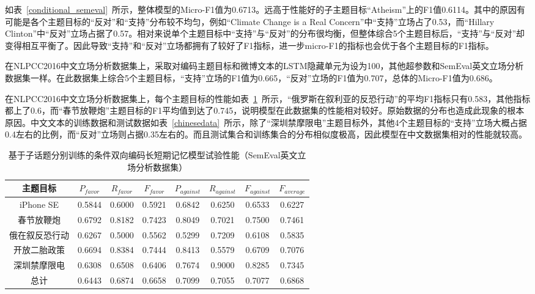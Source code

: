如表~\ref{conditional_semeval}~所示，整体模型的Micro-F1值为0.6713。远高于性能好的子主题目标“Atheism”上的F1值0.6114。其中的原因有可能是各个主题目标的“反对”和“支持”分布较不均匀，例如“Climate Change is a Real Concern”中“支持”立场占了0.53，而“Hillary Clinton”中“反对”立场占据了0.57。相对来说单个主题目标中“支持”与“反对”的分布很均衡，但整体综合5个主题目标后，“支持”与“反对”却变得相互平衡了。因此导致“支持”和“反对”立场都拥有了较好了F1指标，进一步micro-F1的指标也会优于各个主题目标的F1指标。

在NLPCC2016中文立场分析数据集上，采取对编码主题目标和微博文本的LSTM隐藏单元为设为100，其他超参数和SemEval英文立场分析数据集一样。在此数据集上综合5个主题目标，“支持”立场的F1值为0.665，“反对”立场的F1值为0.707，总体的Micro-F1值为0.686。

在NLPCC2016中文立场分析数据集上，每个主题目标的性能如表~\ref{chinese_condition}~所示，“俄罗斯在叙利亚的反恐行动”的平均F1指标只有0.583，其他指标都上了0.6，而“春节放鞭炮”主题目标的F1平均值到达了0.745，说明模型在此数据集的性能相对较好。原始数据的分布也造成此现象的根本原因。中文文本的训练数据和测试数据如表~\ref{chinesedata}~所示，除了“深圳禁摩限电”主题目标外，其他4个主题目标的“支持”立场大概占据0.4左右的比例，而“反对”立场则占据0.35左右的。而且测试集合和训练集合的分布相似度极高，因此模型在中文数据集相对的性能就较高。
\begin{table}[htbp]
	\caption[table123]{基于子话题分别训练的条件双向编码长短期记忆模型试验性能（SemEval英文立场分析数据集）}
	\label{chinese_condition}
	\vspace{0.5em}\centering\wuhao
	\begin{tabular}{cccccccc}
		\toprule[1.5pt]
	主题目标& $P_{favor}$&$R_{favor}$&$F_{favor}$&$P_{against}$&$R_{against}$&$F_{against}$&$F_{average}$ \\
		\midrule[1pt]
		iPhone SE&0.5844&0.6000&0.5921&0.6842&0.6250&0.6533&0.6227\\
		春节放鞭炮&0.6792&0.8182&0.7423&0.8049&0.7021&0.7500&0.7461\\
		俄在叙反恐行动&0.6267&0.5000&0.5562&0.5299&0.7209&0.6108&0.5835\\
		开放二胎政策&0.6694&0.8384&0.7444&0.8413&0.5579&0.6709&0.7076\\
		深圳禁摩限电&0.6308&0.6508&0.6406&0.7674&0.9000&0.8285&0.7345\\
		总计&0.6443&0.6874&0.6658&0.7099&0.7055&0.7077&0.6868\\
		\bottomrule[1.5pt]
	\end{tabular}
\end{table}


